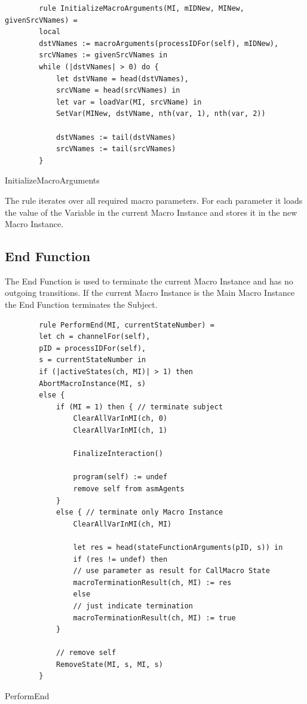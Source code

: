 \begin{listing}[H]
	\begin{verbatim}
		rule InitializeMacroArguments(MI, mIDNew, MINew, givenSrcVNames) =
		local
		dstVNames := macroArguments(processIDFor(self), mIDNew),
		srcVNames := givenSrcVNames in
		while (|dstVNames| > 0) do {
			let dstVName = head(dstVNames),
			srcVName = head(srcVNames) in
			let var = loadVar(MI, srcVName) in
			SetVar(MINew, dstVName, nth(var, 1), nth(var, 2))
			
			dstVNames := tail(dstVNames)
			srcVNames := tail(srcVNames)
		}
	\end{verbatim}
	\caption{InitializeMacroArguments}
	\label{lst:shortasm:InitializeMacroArguments}
\end{listing}


The  rule iterates over all required macro
parameters. For each parameter it loads the value of the Variable in the current Macro Instance and stores it in the
new Macro Instance.




\subsection{End Function}

The End Function is used to terminate the current Macro Instance and has no outgoing transitions.
If the current Macro Instance is the Main Macro Instance the End Function terminates the Subject.


\begin{listing}[H]
	\begin{verbatim}
		rule PerformEnd(MI, currentStateNumber) =
		let ch = channelFor(self),
		pID = processIDFor(self),
		s = currentStateNumber in
		if (|activeStates(ch, MI)| > 1) then
		AbortMacroInstance(MI, s)
		else {
			if (MI = 1) then { // terminate subject
				ClearAllVarInMI(ch, 0)
				ClearAllVarInMI(ch, 1)
				
				FinalizeInteraction()
				
				program(self) := undef
				remove self from asmAgents
			}
			else { // terminate only Macro Instance
				ClearAllVarInMI(ch, MI)
				
				let res = head(stateFunctionArguments(pID, s)) in
				if (res != undef) then
				// use parameter as result for CallMacro State
				macroTerminationResult(ch, MI) := res
				else
				// just indicate termination
				macroTerminationResult(ch, MI) := true
			}
			
			// remove self
			RemoveState(MI, s, MI, s)
		}
	\end{verbatim}
	\caption{PerformEnd}
	\label{lst:shortasm:PerformEnd}
\end{listing}


